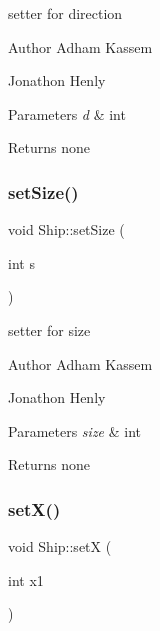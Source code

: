 setter for direction \begin{DoxyAuthor}{Author}
Adham Kassem 

Jonathon Henly 
\end{DoxyAuthor}

\begin{DoxyParams}{Parameters}
{\em d} & int \\
\hline
\end{DoxyParams}
\begin{DoxyReturn}{Returns}
none 
\end{DoxyReturn}
\mbox{\label{classShip_a764524af38d064e299e0ba90ae5f0a32}} 
\subsubsection{\texorpdfstring{set\+Size()}{setSize()}}
{\footnotesize\ttfamily void Ship\+::set\+Size (\begin{DoxyParamCaption}\item[{int}]{s }\end{DoxyParamCaption})\hspace{0.3cm}{\ttfamily [inline]}}

setter for size \begin{DoxyAuthor}{Author}
Adham Kassem 

Jonathon Henly 
\end{DoxyAuthor}

\begin{DoxyParams}{Parameters}
{\em size} & int \\
\hline
\end{DoxyParams}
\begin{DoxyReturn}{Returns}
none 
\end{DoxyReturn}
\mbox{\label{classShip_a060abd2e81215121f18112b88971161e}} 
\subsubsection{\texorpdfstring{set\+X()}{setX()}}
{\footnotesize\ttfamily void Ship\+::setX (\begin{DoxyParamCaption}\item[{int}]{x1 }\end{DoxyParamCaption})\hspace{0.3cm}{\ttfamily [inline]}}

